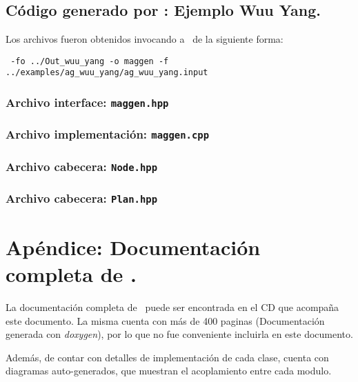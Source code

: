 \section{Código generado por \maggen: Ejemplo Wuu Yang.}
\label{append:agwuuyangcode}

Los archivos fueron obtenidos invocando a \maggen\ de la siguiente forma:

\begin{center}
\footnotesize
\texttt{\maggen\ -fo ../Out\_wuu\_yang -o maggen -f  ../examples/ag\_wuu\_yang/ag\_wuu\_yang.input}
\end{center}

\subsection{Archivo interface: \texttt{maggen.hpp}}
\label{append:maggenhpp}


\subsection{Archivo implementación: \texttt{maggen.cpp}}
\label{append:maggencpp}


\subsection{Archivo cabecera: \texttt{Node.hpp}}
\label{append:nodehpp}


\subsection{Archivo cabecera: \texttt{Plan.hpp}}
\label{append:planhpp}


\normalsize
\chapter{Apéndice: Documentación completa de \maggen.}
\label{chap:appendix-b}
La documentación completa de \maggen\ puede ser encontrada en el CD que acompaña este documento. La misma cuenta con más de 400 paginas (Documentación generada con \textit{doxygen}), por lo que no fue conveniente incluirla en este documento. 

Además, de contar con detalles de implementación de cada clase, cuenta con diagramas auto-generados, que muestran el acoplamiento entre cada modulo.

